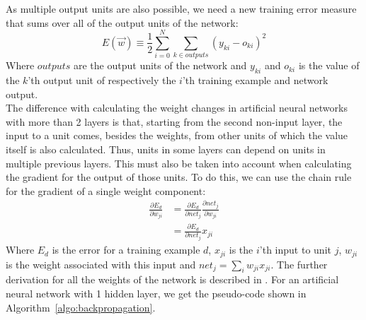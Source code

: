 As multiple output units are also possible, we need a new training error measure that sums over all of the output units of the network:
\begin{equation}
    E(\overrightarrow{w}) \equiv \frac{1}{2} \sum_{i=0}^N \sum_{k \in outputs} (y_{ki} - o_{ki})^2
\end{equation}
Where $outputs$ are the output units of the network and $y_{ki}$ and $o_{ki}$ is the value of the $k$'th output unit of respectively the $i$'th training example and network output.\\

The difference with calculating the weight changes in artificial neural networks with more than 2 layers is that, starting from the second non-input layer, the input to a unit comes, besides the weights, from other units of which the value itself is also calculated.
Thus, units in some layers can depend on units in multiple previous layers. This must also be taken into account when calculating the gradient for the output of those units.
To do this, we can use the chain rule for the gradient of a single weight component:
\begin{align}
    \frac{\partial E_d}{\partial w_{ji}} &= \frac{\partial E_d}{\partial net_j} \frac{\partial net_j}{\partial w_{ji}}\\
    &= \frac{\partial E_d}{\partial net_j} x_{ji}
\end{align}
Where $E_d$ is the error for a training example $d$, $x_{ji}$ is the $i$'th input to unit $j$, $w_{ji}$ is the weight associated with this input and $net_j = \sum_i w_{ji} x_{ji}$. The further derivation for all the weights of the network is described in \cite[Chapter~4]{ML}. For an artificial neural network with 1 hidden layer, we get the pseudo-code shown in Algorithm~\ref{algo:backpropagation}.\\
